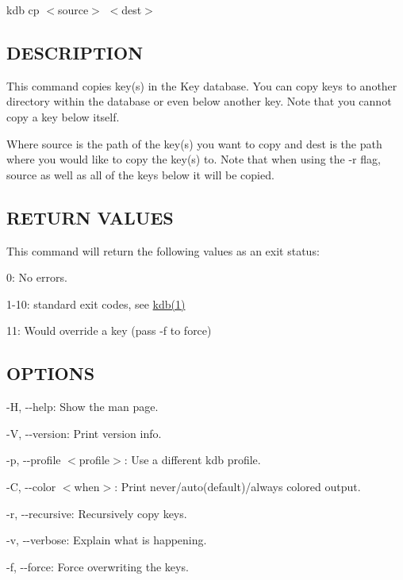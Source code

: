 {\ttfamily kdb cp $<$source$>$ $<$dest$>$}

\subsection*{D\+E\+S\+C\+R\+I\+P\+T\+I\+ON}

This command copies key(s) in the Key database. You can copy keys to another directory within the database or even below another key. Note that you cannot copy a key below itself.

Where {\ttfamily source} is the path of the key(s) you want to copy and {\ttfamily dest} is the path where you would like to copy the key(s) to. Note that when using the {\ttfamily -\/r} flag, {\ttfamily source} as well as all of the keys below it will be copied.

\subsection*{R\+E\+T\+U\+RN V\+A\+L\+U\+ES}

This command will return the following values as an exit status\+:


\begin{DoxyItemize}
\item 0\+: No errors.
\item 1-\/10\+: standard exit codes, see \hyperlink{md_doc_help_kdb_doc_help_kdb_md}{kdb(1)}
\item 11\+: Would override a key (pass {\ttfamily -\/f} to force)
\end{DoxyItemize}

\subsection*{O\+P\+T\+I\+O\+NS}


\begin{DoxyItemize}
\item {\ttfamily -\/H}, {\ttfamily -\/-\/help}\+: Show the man page.
\item {\ttfamily -\/V}, {\ttfamily -\/-\/version}\+: Print version info.
\item {\ttfamily -\/p}, {\ttfamily -\/-\/profile $<$profile$>$}\+: Use a different kdb profile.
\item {\ttfamily -\/C}, {\ttfamily -\/-\/color $<$when$>$}\+: Print never/auto(default)/always colored output.
\item {\ttfamily -\/r}, {\ttfamily -\/-\/recursive}\+: Recursively copy keys.
\item {\ttfamily -\/v}, {\ttfamily -\/-\/verbose}\+: Explain what is happening.
\item {\ttfamily -\/f}, {\ttfamily -\/-\/force}\+: Force overwriting the keys.
\end{DoxyItemize}

